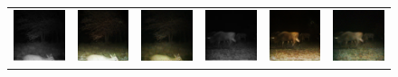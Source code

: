 \begin{figure}[htp!]
\begin{tabularx}{\textwidth}{>{\centering\arraybackslash}X >{\centering\arraybackslash}X >{\centering\arraybackslash}X >{\centering\arraybackslash}X >{\centering\arraybackslash}X >{\centering\arraybackslash}X}
        \includegraphics{gfx/conditional-diffusion-sampling-qual/nir_S2_B06_R1_PICT0387.jpg} & \includegraphics{gfx/conditional-diffusion-sampling-qual/cyclegan_S2_B06_R1_PICT0387_fake.png} & \includegraphics{gfx/conditional-diffusion-sampling-qual/diffusion_S2_B06_R1_PICT0387.png} & \includegraphics{gfx/conditional-diffusion-sampling-qual/nir_S2_B06_R3_PICT1364.jpg} & \includegraphics{gfx/conditional-diffusion-sampling-qual/cyclegan_S2_B06_R3_PICT1364_fake.png} & \includegraphics{gfx/conditional-diffusion-sampling-qual/diffusion_S2_B06_R3_PICT1364.png} \\

\end{tabularx}
\end{figure}

